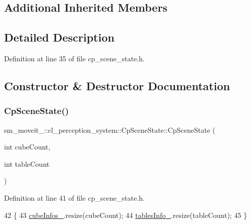 \subsection*{Additional Inherited Members}


\subsection{Detailed Description}


Definition at line 35 of file cp\+\_\+scene\+\_\+state.\+h.



\subsection{Constructor \& Destructor Documentation}
\mbox{\label{classsm__moveit__4_1_1cl__perception__system_1_1CpSceneState_a276c80729d5fb92a3d6a7805c55d3f04}} 
\subsubsection{\texorpdfstring{Cp\+Scene\+State()}{CpSceneState()}}
{\footnotesize\ttfamily sm\+\_\+moveit\+\_\+::cl\+\_\+perception\+\_\+system\+::\+Cp\+Scene\+State\+::\+Cp\+Scene\+State (\begin{DoxyParamCaption}\item[{int}]{cube\+Count,  }\item[{int}]{table\+Count }\end{DoxyParamCaption})\hspace{0.3cm}{\ttfamily [inline]}}



Definition at line 41 of file cp\+\_\+scene\+\_\+state.\+h.


\begin{DoxyCode}
42             \{
43                 \hyperlink{classsm__moveit__4_1_1cl__perception__system_1_1CpSceneState_a734a45934cccf19ac5c886cd94bc8cda}{cubeInfos\_}.resize(cubeCount);
44                 \hyperlink{classsm__moveit__4_1_1cl__perception__system_1_1CpSceneState_a95f74dd16566d97e017650ccdf4b8a46}{tablesInfo\_}.resize(tableCount);
45             \}
\end{DoxyCode}


